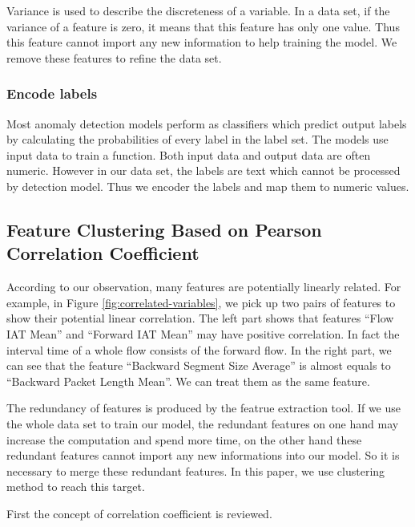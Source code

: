 \documentclass{ieeeaccess}
\theoremstyle{definition}
\begin{document}
Variance is used to describe the discreteness of a variable. In a data set, if the variance of a feature is zero, it means that this feature has only one value. Thus this feature cannot import any new information to help training the model. We remove these features to refine the data set.

\subsubsection{Encode labels}

Most anomaly detection models perform as classifiers which predict output labels by calculating the probabilities of every label in the label set. The models use input data to train a function. Both input data and output data are often numeric. However in our data set, the labels are text which cannot be processed by detection model. Thus we encoder the labels and map them to numeric values.

\subsection{Feature Clustering Based on Pearson Correlation Coefficient}

According to our observation, many features are potentially linearly related. For example, in Figure \ref{fig:correlated-variables}, we pick up two pairs of features to show their potential linear correlation. The left part shows that features ``Flow IAT Mean'' and ``Forward IAT Mean'' may have positive correlation. In fact the interval time of a whole flow consists of the forward flow. In the right part, we can see that the feature ``Backward Segment Size Average'' is almost equals to ``Backward Packet Length Mean''. We can treat them as the same feature.

The redundancy of features is produced by the featrue extraction tool. If we use the whole data set to train our model, the redundant features on one hand may increase the computation and spend more time, on the other hand these redundant features cannot import any new informations into our model. So it is necessary to merge these redundant features. In this paper, we use clustering method to reach this target.

First the concept of correlation coefficient is reviewed.
\end{document}
